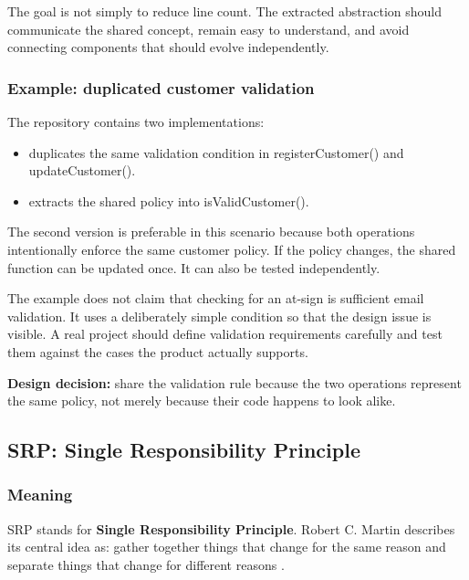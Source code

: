 \documentclass[12pt,a4paper]{article}
\begin{document}
The goal is not simply to reduce line count. The extracted abstraction should communicate the shared concept, remain easy to understand, and avoid connecting components that should evolve independently.

\subsubsection{Example: duplicated customer validation}

The repository contains two implementations:

\begin{itemize}

\item {} duplicates the same validation condition in registerCustomer() and updateCustomer().

\item {} extracts the shared policy into isValidCustomer().

\end{itemize}

The second version is preferable in this scenario because both operations intentionally enforce the same customer policy. If the policy changes, the shared function can be updated once. It can also be tested independently.

The example does not claim that checking for an at-sign is sufficient email validation. It uses a deliberately simple condition so that the design issue is visible. A real project should define validation requirements carefully and test them against the cases the product actually supports.

\textbf{Design decision:} share the validation rule because the two operations represent the same policy, not merely because their code happens to look alike.

\subsection{SRP: Single Responsibility Principle}

\subsubsection{Meaning}

SRP stands for \textbf{Single Responsibility Principle}. Robert C. Martin describes its central idea as: gather together things that change for the same reason and separate things that change for different reasons \cite{martin2010srp}.
\end{document}
